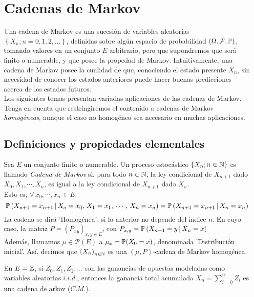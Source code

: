 
\section{Cadenas de Markov}
Una cadena de Markov es una sucesión de variables aleatorias $\left\{X_n;n=0,1,2,...\right\}$, definidas sobre algún espacio de probabilidad $\left(\Omega,\mathcal{
F}, \mathbb{P}\right)$, tomando valores en un conjunto $E$ arbitrario, pero que supondremos que será finito o numerable, y que posee la propedad de Markov. Intuitívamente, una cadena de Markov posee la cualidad de que, conociendo el estado presente $X_n$, sin necesidad de conocer los estados anteriores puede hacer buenas predicciones acerca de los estados futuros.\\ Los siguientes temas presentan variadas aplicaciones de las cadenas de Markov. Tenga en cuenta que restringiremos el contenido a cadenas de Markov \textit{homogéneas}, aunque el caso no homogéneo sea necesario en muchas aplicaciones.

\subsection{Definiciones y propiedades elementales}

\begin{definicion}
Sea $E$ un conjunto finito o numerable. Un proceso estocástico $\{X_n;n\in \mathbb N\}$ es llamado \textit{Cadena de Markov} si, para todo $n\in\mathbb N$, la ley condicional de $X_{n+1}$ dado $X_0,X_1,\cdots,X_n$, es igual a la ley condicional de $X_{n+1}$ dado $X_n$.\\ \newline Esto es; $\forall\,x_0,\cdots,x_n\,\in E$:
\[\mathbb{P}\left(X_{n+1}=x_{n+1}\,|\,X_o = x_0,\,X_1=x_1,\,\cdots,\,X_n=x_n\right) = \mathbb{P}\left(X_{n+1}=x_{n+1}\,|\,X_n=x_n\right)\]
La cadena se dirá 'Homogénea', si lo anterior no depende del índice $n$. En cuyo caso, la matriz $P=\left(P_{xy}\right)_{x,y\in E}$, con $P_{x,y} = \mathbb{P}\left(X_{n+1}=y\,|\,X_n = x\right)$\\ \newline
Además, llamamos $\mu\in \mathcal{P}(E)$ a $\mu_x = \mathbb{P}(X_0 = x)$, denominada 'Distribución inicial'. Así, decimos que $\left(X_n\right)_{n\in\mathbb N}$ es una $(\mu,P)$-cadena de Markov homogénea.
\end{definicion}

\begin{ejemplo}
En $E=\mathbb Z$, si $Z_0,Z_1,Z_2,...$ son las ganancias de apuestas modeladas como variables aleatorias $i.i.d.$, entonces la ganancia total acumulada $X_n = \sum_{i=0}^nZ_i$ es una cadena de arkov ($C.M.$).
\end{ejemplo}


